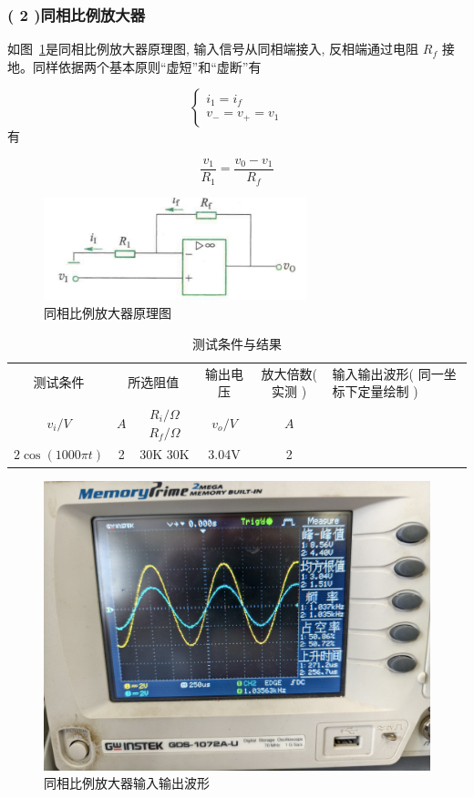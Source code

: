 \documentclass[10pt, a4paper]{article} %
\begin{document}
\clearpage
\subsubsection*{( 2 )同相比例放大器}

如图~\hyperref[fig:non-inverting-amplifier]{\ref{fig:non-inverting-amplifier}}是同相比例放大器原理图, 输入信号从同相端接入, 反相端通过电阻 $R_f$ 接地。同样依据两个基本原则“虚短”和“虚断”有

 $$
\begin{cases}
i_1 = i_f \\
v_- = v_+ = v_1
\end{cases}
$$ 
有

 $$
\frac{v_1}{R_1} = \frac{v_0 - v_1}{R_f}
$$ 

\begin{figure}[ht]
    \centering
    \includegraphics[width=0.7\linewidth]{image/4.png}
    \caption{同相比例放大器原理图}
    \label{fig:non-inverting-amplifier}
\end{figure}

\begin{table}[ht]
    \centering
    \caption{测试条件与结果}
    \begin{tabular}{cccccp{3.5cm}}
        \toprule
        测试条件 & \multicolumn{2}{c}{所选阻值} & 输出电压 & 放大倍数( 实测 ) & 输入输出波形( 同一坐标下定量绘制 ) \\
        \cmidrule(lr){2-3} \cmidrule(lr){4-4} \cmidrule(lr){5-5}
        $v_i/V$ & $A$ & $R_i/\Omega$ \quad $R_f/\Omega$ & $v_o/V$ & $A$& \\
        \midrule
        $2\cos(1000\pi t)$ & 2 &30K \quad 30K&3.04V&2&\\
        \bottomrule
    \end{tabular}
\end{table}
\begin{figure}[ht]
    \centering
    \includegraphics[width=0.7\linewidth]{image/6.jpg}
    \caption{同相比例放大器输入输出波形}
    \label{fig:non-inverting-amplifier-waveform}
\end{figure}
\end{document}
